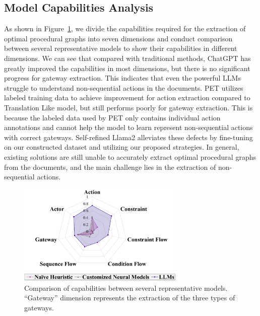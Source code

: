 
\subsection{Model Capabilities Analysis}
As shown in Figure~\ref{fig:Radar}, we divide the capabilities required for the extraction of optimal procedural graphs into seven dimensions and conduct comparison between several representative models to show their capabilities in different dimensions. 
We can see that compared with traditional methods, ChatGPT has greatly improved the capabilities in most dimensions, but there is no significant progress for gateway extraction. This indicates that even the powerful LLMs struggle to understand non-sequential actions in the documents. PET utilizes labeled training data to achieve improvement for action extraction compared to Translation Like model, but still performs poorly for gateway extraction. This is because the labeled data used by PET only contains individual action annotations and cannot help the model to learn represent non-sequential actions with correct gateways. Self-refined Llama2 alleviates these defects by fine-tuning on our constructed dataset and utilizing our proposed strategies. 
In general, existing solutions are still unable to accurately extract optimal procedural graphs from the documents, and the main challenge lies in the extraction of non-sequential actions. 

\begin{figure}[h]
    \centering
    \includegraphics[width=8cm]{figures/Radar.png}
    \caption{Comparison of capabilities between several representative models. ``Gateway'' dimension represents the extraction of the three types of gateways. 
    }
    \label{fig:Radar}
\end{figure}

